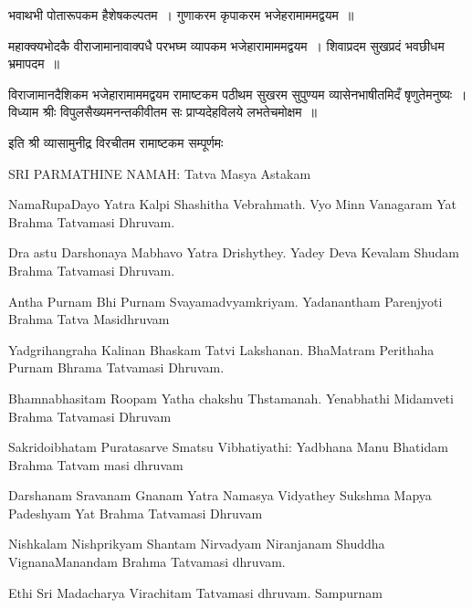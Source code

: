  भवाथभी पोतारूपकम हैशेषकल्पतम~।
 गुणाकरम कृपाकरम भजेहरामाममद्वयम~॥

 महाक्क्यभोदकै वीराजामानावाक्पधै
 परभघ्म व्यापकम भजेहारामाममद्वयम~।
 शिवाप्रदम सुखप्रदं भवछीधम भ्रमापदम~॥

 विराजामानदैशिकम भजेहारामाममद्वयम 
 रामाष्टकम पठीथम सुखरम सुपुण्यम 
 व्यासेनभाषीतमिदँ षृणुतेमनुष्यः~।
 विध्याम श्रीः विपुलसैख्यमनन्तकीवीतम
 सः प्राप्यदेहविलये लभतेचमोक्षम~॥

इति श्री व्यासामुनीद्र विरचीतम रामाष्टकम सम्पूर्णमः


SRI PARMATHINE NAMAH: Tatva Masya Astakam

 NamaRupaDayo Yatra Kalpi Shashitha Vebrahmath.
 Vyo Minn Vanagaram Yat Brahma Tatvamasi Dhruvam.

 Dra astu Darshonaya Mabhavo Yatra Drishythey.
 Yadey Deva Kevalam Shudam Brahma Tatvamasi Dhruvam.

 Antha Purnam Bhi Purnam Svayamadvyamkriyam.
 Yadanantham Parenjyoti Brahma Tatva Masidhruvam

 Yadgrihangraha Kalinan Bhaskam Tatvi Lakshanan.
 BhaMatram Perithaha Purnam Bhrama Tatvamasi Dhruvam.

 Bhamnabhasitam Roopam Yatha chakshu Thstamanah.
 Yenabhathi Midamveti Brahma Tatvamasi Dhruvam

 Sakridoibhatam Puratasarve Smatsu Vibhatiyathi:
 Yadbhana Manu Bhatidam Brahma Tatvam masi dhruvam

 Darshanam Sravanam Gnanam Yatra Namasya Vidyathey
 Sukshma Mapya Padeshyam Yat Brahma Tatvamasi Dhruvam

 Nishkalam Nishprikyam Shantam Nirvadyam Niranjanam
 Shuddha VignanaManandam Brahma Tatvamasi dhruvam.

Ethi Sri Madacharya Virachitam Tatvamasi dhruvam. Sampurnam

